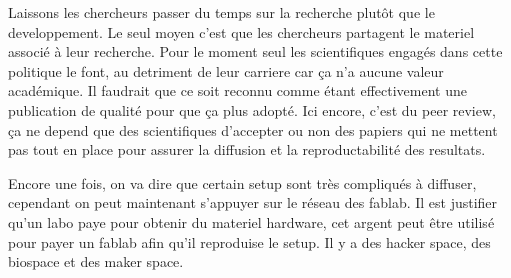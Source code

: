 Laissons les chercheurs passer du temps sur la recherche plutôt que le developpement. Le seul moyen c'est que les chercheurs partagent le materiel associé à leur recherche. Pour le moment seul les scientifiques engagés dans cette politique le font, au detriment de leur carriere car ça n'a aucune valeur académique. Il faudrait que ce soit reconnu comme étant effectivement une publication de qualité pour que ça plus adopté.
Ici encore, c'est du peer review, ça ne depend que des scientifiques d'accepter ou non des papiers qui ne mettent pas tout en place pour assurer la diffusion et la reproductabilité des resultats.


Encore une fois, on va dire que certain setup sont très compliqués à diffuser, cependant on peut maintenant s'appuyer sur le réseau des fablab. Il est justifier qu'un labo paye pour obtenir du materiel hardware, cet argent peut être utilisé pour payer un fablab afin qu'il reproduise le setup. Il y a des hacker space, des biospace et des maker space.





